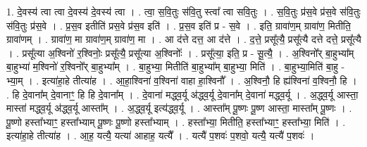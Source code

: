 \documentclass[17pt]{extarticle}
\begin{document}
1. दे॒वस्य॑ त्वा त्वा दे॒वस्य॑ दे॒वस्य॑ त्वा । . त्वा॒ स॒वि॒तुः स॑वि॒तु स्त्वा᳚ त्वा सवि॒तुः । . स॒वि॒तुः प्र॑स॒वे प्र॑स॒वे स॑वि॒तुः स॑वि॒तुः प्र॑स॒वे । . प्र॒स॒व इतीति॑ प्रस॒वे प्र॑स॒व इति॑ । . प्र॒स॒व इति॑ प्र - स॒वे । . इति॒ ग्रावा॑ण॒म् ग्रावा॑ण॒ मितीति॒ ग्रावा॑णम् । . ग्रावा॑ण॒ मा ग्रावा॑ण॒म् ग्रावा॑ण॒ मा । . आ द॑त्ते दत्त॒ आ द॑त्ते । . द॒त्ते॒ प्रसू᳚त्यै॒ प्रसू᳚त्यै दत्ते दत्ते॒ प्रसू᳚त्यै । . प्रसू᳚त्या अ॒श्विनो॑ र॒श्विनोः॒ प्रसू᳚त्यै॒ प्रसू᳚त्या अ॒श्विनोः᳚ । . प्रसू᳚त्या॒ इति॒ प्र - सू॒त्यै॒ । . अ॒श्विनो᳚र् बा॒हुभ्या᳚म् बा॒हुभ्या॑ म॒श्विनो॑ र॒श्विनो᳚र् बा॒हुभ्या᳚म् । . बा॒हुभ्या॒ मितीति॑ बा॒हुभ्या᳚म् बा॒हुभ्या॒ मिति॑ । . बा॒हुभ्या॒मिति॑ बा॒हु - भ्या॒म् । . इत्या॑हा॒हे तीत्या॑ह । . आ॒हा॒श्विना॑ व॒श्विना॑ वाहा हा॒श्विनौ᳚ । . अ॒श्विनौ॒ हि ह्य॑श्विना॑ व॒श्विनौ॒ हि । . हि दे॒वाना᳚म् दे॒वानाꣳ॒॒ हि हि दे॒वाना᳚म् । . दे॒वाना॑ मद्ध्व॒र्यू अ॑द्ध्व॒र्यू दे॒वाना᳚म् दे॒वाना॑ मद्ध्व॒र्यू । . अ॒द्ध्व॒र्यू आस्ता॒ मास्ता॑ मद्ध्व॒र्यू अ॑द्ध्व॒र्यू आस्ता᳚म् । . अ॒द्ध्व॒र्यू इत्य॑द्ध्व॒र्यू । . आस्ता᳚म् पू॒ष्णः पू॒ष्ण आस्ता॒ मास्ता᳚म् पू॒ष्णः । . पू॒ष्णो हस्ता᳚भ्याꣳ॒॒ हस्ता᳚भ्याम् पू॒ष्णः पू॒ष्णो हस्ता᳚भ्याम् । . हस्ता᳚भ्या॒ मितीति॒ हस्ता᳚भ्याꣳ॒॒ हस्ता᳚भ्या॒ मिति॑ । . इत्या॑हा॒हे तीत्या॑ह । . आ॒ह॒ यत्यै॒ यत्या॑ आहाह॒ यत्यै᳚ । . यत्यै॑ प॒शवः॑ प॒शवो॒ यत्यै॒ यत्यै॑ प॒शवः॑ । \newline
\end{document}
